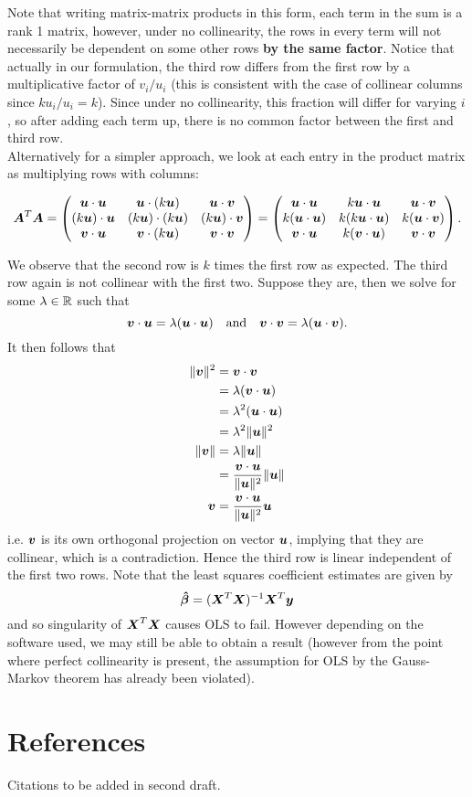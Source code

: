 \documentclass[12pt]{article}
\newcommand{\gbh}{\hat{\gb}}
\begin{document}
	Note that writing matrix-matrix products in this form, each term in the sum is a rank 1 matrix, however, under no collinearity, the rows in every term will not necessarily be dependent on some other rows \textbf{by the same factor}. Notice that actually in our formulation, the third row differs from the first row by a multiplicative factor of $v_i/u_i$ (this is consistent with the case of collinear columns since $ku_i/u_i=k$). Since under no collinearity, this fraction will differ for varying $i$, so after adding each term up, there is no common factor between the first and third row.\\
	
	Alternatively for a simpler approach, we look at each entry in the product matrix as multiplying rows with columns:
	
	$$\boldsymbol{A}^T\boldsymbol{A}=\begin{pmatrix}
		\boldsymbol{u}\cdot\boldsymbol{u} & \boldsymbol{u}\cdot(k\boldsymbol{u}) & \boldsymbol{u}\cdot\boldsymbol{v}\\
		(k\boldsymbol{u})\cdot\boldsymbol{u} & (k\boldsymbol{u})\cdot(k\boldsymbol{u}) & (k\boldsymbol{u})\cdot\boldsymbol{v} \\
		\boldsymbol{v}\cdot\boldsymbol{u} & \boldsymbol{v}\cdot(k\boldsymbol{u}) & \boldsymbol{v}\cdot\boldsymbol{v}
	\end{pmatrix}=\begin{pmatrix}
		\boldsymbol{u}\cdot\boldsymbol{u} & k\boldsymbol{u}\cdot\boldsymbol{u} & \boldsymbol{u}\cdot\boldsymbol{v}\\
		k(\boldsymbol{u}\cdot\boldsymbol{u}) & k(k\boldsymbol{u}\cdot\boldsymbol{u}) & k(\boldsymbol{u}\cdot\boldsymbol{v}) \\
		\boldsymbol{v}\cdot\boldsymbol{u} & k(\boldsymbol{v}\cdot\boldsymbol{u}) & \boldsymbol{v}\cdot\boldsymbol{v}
	\end{pmatrix}.$$
	
	We observe that the second row is $k$ times the first row as expected. The third row again is not collinear with the first two. Suppose they are, then we solve for some $\lm\in\RR$ such that
	$$\boldsymbol{v}\cdot\boldsymbol{u}=\lambda(\boldsymbol{u}\cdot\boldsymbol{u}) \quad \text{and}\quad \boldsymbol{v}\cdot\boldsymbol{v}=\lambda(\boldsymbol{u}\cdot\boldsymbol{v}).$$
	It then follows that
	\begin{align*}
		\|\boldsymbol{v}\|^2&=\boldsymbol{v}\cdot\boldsymbol{v}\\
		&=\lambda(\boldsymbol{v}\cdot\boldsymbol{u})\\
		&=\lambda^2(\boldsymbol{u}\cdot\boldsymbol{u})\\
		&=\lambda^2\|\boldsymbol{u}\|^2\\ 
		\|\boldsymbol{v}\|&=\lambda\|\boldsymbol{u}\|\\
		&=\dfrac{\boldsymbol{v}\cdot\boldsymbol{u}}{\|\boldsymbol{u}\|^2}\|\boldsymbol{u}\|\\
		\boldsymbol{v}&=\dfrac{\boldsymbol{v}\cdot\boldsymbol{u}}{\|\boldsymbol{u}\|^2}\boldsymbol{u}
	\end{align*}
	$$$$
	i.e. $\boldsymbol{v}$ is its own orthogonal projection on vector $\boldsymbol{u}$, implying that they are collinear, which is a contradiction. Hence the third row is linear independent of the first two rows. Note that the least squares coefficient estimates are given by
	$$\boldsymbol{\gbh}=(\bmX^T\bmX)^{-1}\bmX^T\bmy$$
	and so singularity of $\boldsymbol{X}^T\boldsymbol{X}$ causes OLS to fail. However depending on the software used, we may still be able to obtain a result (however from the point where perfect collinearity is present, the assumption for OLS by the Gauss-Markov theorem has already been violated).\\
	
	\section{References}
	Citations to be added in second draft.
	
\end{document}
